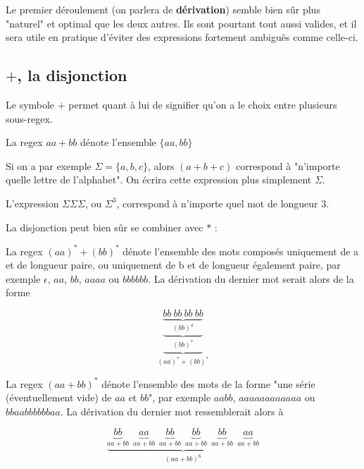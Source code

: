Le premier déroulement (on parlera de \textbf{dérivation}) semble bien sûr plus "naturel" et optimal que les deux autres. Ils sont pourtant tout aussi valides, et il sera utile en pratique d'éviter des expressions fortement ambiguës comme celle-ci.


\subsection{$+$, la disjonction}

Le symbole $+$ permet quant à lui de signifier qu'on a le choix entre plusieurs sous-regex.

\begin{example}
La regex $aa+bb$ dénote l'ensemble $\{aa,bb\}$
\end{example}

Si on a par exemple $\Sigma = \{a,b,c\}$, alors $(a+b+c)$ correspond à "n'importe quelle lettre de l'alphabet". On écrira cette expression plus simplement $\Sigma$.

\begin{example}
L'expression $\Sigma \Sigma \Sigma$, ou $\Sigma^3$, correspond à n'importe quel mot de longueur 3.
\end{example}

La disjonction peut bien sûr se combiner avec $*$ :

\begin{example}
\label{ex3}
La regex $(aa)^*+(bb)^*$ dénote l'ensemble des mots composés uniquement de a et de longueur paire, ou uniquement de b et de longueur également paire, par exemple $\epsilon$, $aa$, $bb$, $aaaa$ ou $bbbbbb$. La dérivation du dernier mot serait alors de la forme 

\[
\underbrace{\underbrace{\underbrace{bb~bb~bb~bb}_\text{$(bb)^4$}}_\text{$(bb)^*$}}_\text{$(aa)^*+(bb)^*$}
\]
\end{example}

\begin{example}
\label{ex4}
La regex $(aa+bb)^*$ dénote l'ensemble des mots de la forme "une série  (éventuellement vide) de $aa$ et $bb$", par exemple $aabb$, $aaaaaaaaaaaa$ ou $bbaabbbbbbaa$. La dérivation du dernier mot ressemblerait alors à 

\[
\underbrace{\underbrace{bb}_\text{$aa+bb$}~~\underbrace{aa}_\text{$aa+bb$}~~\underbrace{bb}_\text{$aa+bb$}~~\underbrace{bb}_\text{$aa+bb$}~~\underbrace{bb}_\text{$aa+bb$}~~\underbrace{aa}_\text{$aa+bb$}}_\text{$(aa+bb)^6$}
\]
\end{example}

